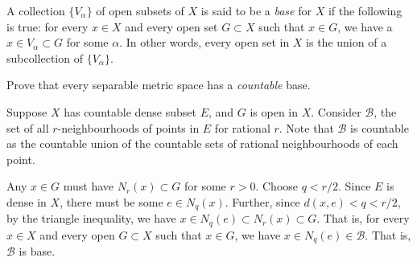 \documentclass[12 pt, letterpaper]{hmcpset}
\begin{document}
\pagebreak

\begin{problem}
	A collection $\{ V_{\alpha} \}$ of open subsets of $X$ is said to be a \emph{base} for $X$ if the following is true: for every $x \in X$ and every open set $G \subset X$ such that $x \in G$, we have a $x \in V_{\alpha} \subset G$ for some $\alpha$. In other words, every open set in $X$ is the union of a subcollection of $\{ V_{\alpha} \}$.

	Prove that every separable metric space has a \emph{countable} base.
\end{problem}

\begin{solution}
	Suppose $X$ has countable dense subset $E$, and $G$ is open in $X$. Consider $\mathcal{B}$, the set of all $r$-neighbourhoods of points in $E$ for rational $r$. Note that $\mathcal{B}$ is countable as the countable union of the countable sets of rational neighbourhoods of each point.

	Any $x \in G$ must have $N_{r}(x) \subset G$ for some $r > 0$. Choose $q < r/2$. Since $E$ is dense in $X$, there must be some $e \in N_{q}(x)$. Further, since $d(x, e) < q < r/2$, by the triangle inequality, we have $x \in N_{q}(e) \subset N_{r}(x) \subset G$. That is, for every $x \in X$ and every open $G \subset X$ such that $x \in G$, we have $x \in N_{q}(e) \in \mathcal{B}$. That is, $\mathcal{B}$ is base.
\end{solution}
\end{document}
